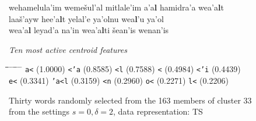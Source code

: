 \begin{figure}[!t]
\begin{mdframed}
\begin{normalsize}
\begin{tabbing}
wehamelula\a'{i}m \> weme\v{s}ul\a'{a}l \> mitlale\a'{i}m \> \textbf{}a\textbf{}\a'{a}\textbf{l} \> hamidra\a'{a} \> we\textbf{}a\textbf{}\a'{a}\textbf{l}t \\
laa\v{s}\a'{a}yw \> he\textbf{}e\textbf{}\a'{a}\textbf{l}t \> yelal\a'{e} \> ya\a'{o}lnu \> we\textbf{}a\textbf{}\textbf{l}\a'{u} \> ya\a'{o}l \\
we\textbf{}a\textbf{}\a'{a}\textbf{l} \> leyad\a'{a} \> na\a'{i}n \> we\textbf{}a\textbf{}\a'{a}\textbf{l}ti \> \v{s}ean\a'{i}s \> wenan\a'{i}s 
\end{tabbing}
\end{normalsize}
\vspace{-3pt}
\begin{mdframed}
\begin{small}
\textit{Ten most active centroid features}
\vspace{-3pt}
\begin{tabbing}
\hspace*{6ex}\= \hspace*{12ex}\= \hspace*{6ex}\= \hspace*{12ex} \= \hspace*{6ex} \= \hspace*{12ex} \= \hspace*{7ex}\= \hspace*{13ex} \= \hspace*{7ex} \= \hspace*{9.5ex}\kill
\texttt{a<} \> (1.0000) \> \texttt{<\a'{a}} \> (0.8585) \> \texttt{<l} \> (0.7588) \> \texttt{<} \> (0.4984) \> \texttt{<\a'{i}} \> (0.4439)\\
\texttt{e<} \> (0.3341) \> \texttt{\a'{a}<l} \> (0.3159) \> \texttt{<n} \> (0.2960) \> \texttt{o<} \> (0.2271) \> \texttt{l<} \> (0.2206)
\end{tabbing}
\end{small}
\end{mdframed}
\caption{Thirty words randomly selected from the 163 members of cluster 33 from the settings $s=0,\delta =2$, data representation: TS}
\label{fig:cluster-33-0-2-TS}
\end{mdframed}
\end{figure}

